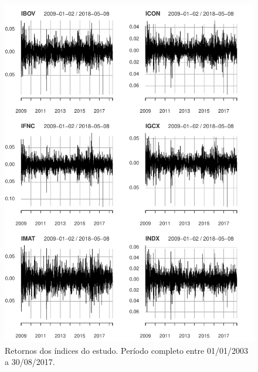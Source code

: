 \documentclass{article}
\begin{document}
	
	
	
	
	

	

	
	
	
	
	
	

	\begin{figure}[H]
		\centering
		\includegraphics[width=1\linewidth]{figs/artigo-retornos}
		\caption{Retornos dos índices do estudo. Período completo entre 01/01/2003 a 30/08/2017.}
		\label{fig:artigo-retornos}
	\end{figure}
\end{document}
